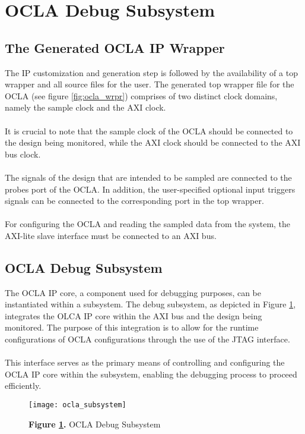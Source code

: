 \newpage
{}

\section*{ \hfill OCLA Debug Subsystem}


{}


\subsection*{\fontsize{14}{16}\selectfont The Generated OCLA IP Wrapper}
The IP customization and generation step is followed by the availability of a top wrapper and all source files for the user. The generated top wrapper file for the OCLA (see figure \ref{fig:ocla_wrpr}) comprises of two distinct clock domains, namely the sample clock and the AXI clock. 
\\ \\It is crucial to note that the sample clock of the OCLA should be connected to the design being monitored, while the AXI clock should be connected to the AXI bus clock.
\\ \\The signals of the design that are intended to be sampled are connected to the probes port of the OCLA. In addition, the user-specified optional input triggers signals can be connected to the corresponding port in the top wrapper.
\\ \\For configuring the OCLA and reading the sampled data from the system, the AXI-lite slave interface must be connected to an AXI bus.

\subsection*{\fontsize{14}{16}\selectfont OCLA Debug Subsystem}
 The OCLA IP core, a component used for debugging purposes, can be instantiated within a subsystem. The debug subsystem, as depicted in Figure \ref{fig:ocla_subsystem}, integrates the OLCA IP core within the AXI bus and the design being monitored. The purpose of this integration is to allow for the runtime configurations of OCLA configurations through the use of the JTAG interface.
\\ \\This interface serves as the primary means of controlling and configuring the OCLA IP core within the subsystem, enabling the debugging process to proceed efficiently.

\begin{figure}[h]\centering %
	\texttt{[image: ocla\_subsystem]}
	\caption{\textbf{Figure \ref{fig:ocla_subsystem}.} OCLA Debug Subsystem}
	\label{fig:ocla_subsystem}
\end{figure}


